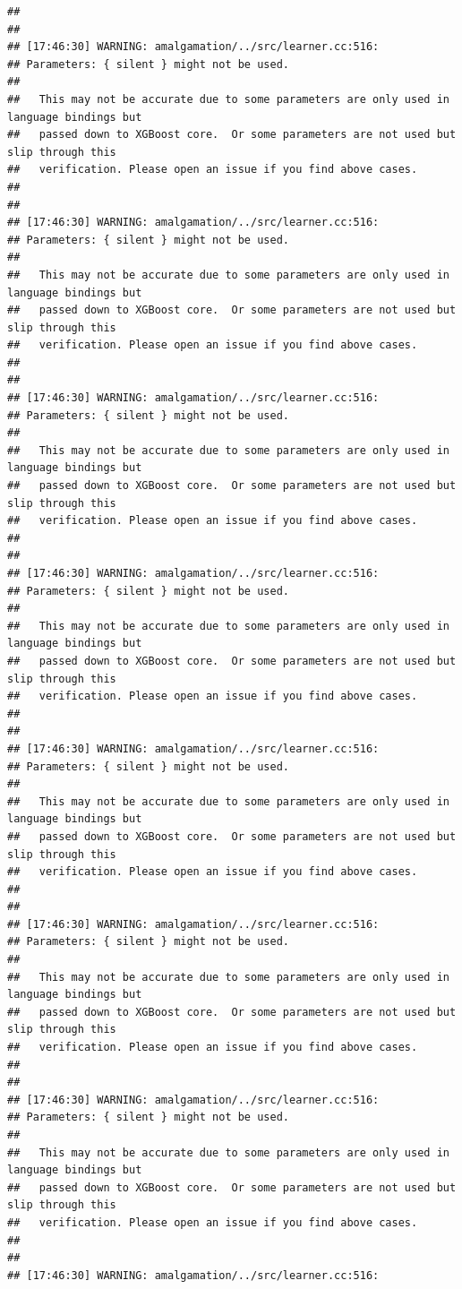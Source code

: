 \documentclass[AMS,STIX2COL]{WileyNJD-v2}\usepackage[]{graphicx}\usepackage[]{color}
\makeatletter
\newenvironment{kframe}{%
 \def\at@end@of@kframe{}%
 \ifinner\ifhmode%
  \def\at@end@of@kframe{\end{minipage}}%
  \begin{minipage}{\columnwidth}%
 \fi\fi%
 \def\FrameCommand##1{\hskip\@totalleftmargin \hskip-\fboxsep
 \colorbox{shadecolor}{##1}\hskip-\fboxsep
     \hskip-\linewidth \hskip-\@totalleftmargin \hskip\columnwidth}%
 \MakeFramed {\advance\hsize-\width
   \@totalleftmargin\z@ \linewidth\hsize
   \@setminipage}}%
 {\par\unskip\endMakeFramed%
 \at@end@of@kframe}
\newenvironment{knitrout}{}{} %
\makeatother
\begin{document}
\begin{knitrout}
\begin{kframe}
\begin{verbatim}
## 
## 
## [17:46:30] WARNING: amalgamation/../src/learner.cc:516: 
## Parameters: { silent } might not be used.
## 
##   This may not be accurate due to some parameters are only used in language bindings but
##   passed down to XGBoost core.  Or some parameters are not used but slip through this
##   verification. Please open an issue if you find above cases.
## 
## 
## [17:46:30] WARNING: amalgamation/../src/learner.cc:516: 
## Parameters: { silent } might not be used.
## 
##   This may not be accurate due to some parameters are only used in language bindings but
##   passed down to XGBoost core.  Or some parameters are not used but slip through this
##   verification. Please open an issue if you find above cases.
## 
## 
## [17:46:30] WARNING: amalgamation/../src/learner.cc:516: 
## Parameters: { silent } might not be used.
## 
##   This may not be accurate due to some parameters are only used in language bindings but
##   passed down to XGBoost core.  Or some parameters are not used but slip through this
##   verification. Please open an issue if you find above cases.
## 
## 
## [17:46:30] WARNING: amalgamation/../src/learner.cc:516: 
## Parameters: { silent } might not be used.
## 
##   This may not be accurate due to some parameters are only used in language bindings but
##   passed down to XGBoost core.  Or some parameters are not used but slip through this
##   verification. Please open an issue if you find above cases.
## 
## 
## [17:46:30] WARNING: amalgamation/../src/learner.cc:516: 
## Parameters: { silent } might not be used.
## 
##   This may not be accurate due to some parameters are only used in language bindings but
##   passed down to XGBoost core.  Or some parameters are not used but slip through this
##   verification. Please open an issue if you find above cases.
## 
## 
## [17:46:30] WARNING: amalgamation/../src/learner.cc:516: 
## Parameters: { silent } might not be used.
## 
##   This may not be accurate due to some parameters are only used in language bindings but
##   passed down to XGBoost core.  Or some parameters are not used but slip through this
##   verification. Please open an issue if you find above cases.
## 
## 
## [17:46:30] WARNING: amalgamation/../src/learner.cc:516: 
## Parameters: { silent } might not be used.
## 
##   This may not be accurate due to some parameters are only used in language bindings but
##   passed down to XGBoost core.  Or some parameters are not used but slip through this
##   verification. Please open an issue if you find above cases.
## 
## 
## [17:46:30] WARNING: amalgamation/../src/learner.cc:516: 

\end{verbatim}
\end{kframe}
\end{knitrout}
\end{document}
